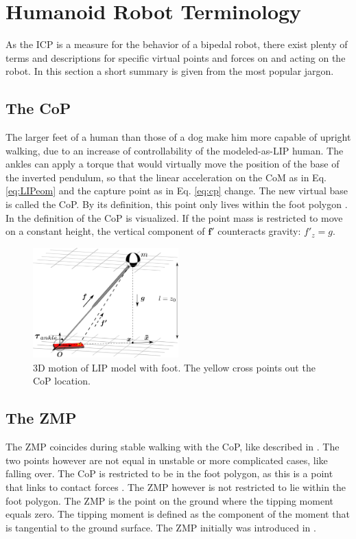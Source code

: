 \section{Humanoid Robot Terminology}
As the \ac{ICP} is a measure for the behavior of a bipedal robot, there exist plenty of terms and descriptions for specific virtual points and forces on and acting on the robot. In this section a short summary is given from the most popular jargon.

\subsection{The \ac{CoP}}
The larger feet of a human than those of a dog make him more capable of upright walking, due to an increase of controllability of the modeled-as-\ac{LIP} human. The ankles can apply a torque that would virtually move the position of the base of the inverted pendulum, so that the linear acceleration on the \ac{CoM} as in Eq. \eqref{eq:LIPeom} and the capture point as in Eq. \eqref{eq:cp} change. The new virtual base is called the \ac{CoP}. By its definition, this point only lives within the foot polygon \cite{vukobratovic2004zero}. In  the definition of the \ac{CoP} is visualized. If the point mass is restricted to move on a constant height, the vertical component of $\boldsymbol{f'}$ counteracts gravity: $f'_z=g$. 
\begin{figure}[h]
\centering
\includegraphics[width=0.5\textwidth]{STYLESTUFF/3DCoMwithfoot.png}
\caption{\ac{3D} motion of \ac{LIP} model with foot. The yellow cross points out the \ac{CoP} location.}
\label{fig:3dlipfoot}
\end{figure}

\subsection{The \ac{ZMP}}
The \ac{ZMP} coincides during stable walking with the \ac{CoP}, like described in \cite{vukobratovic2004zero}. The two points however are not equal in unstable or more complicated cases, like falling over.  The \ac{CoP} is restricted to be in the foot polygon, as this is a point that links to contact forces \cite{sardain2004forces}. The \ac{ZMP} however is not restricted to lie within the foot polygon. The \ac{ZMP} is the point on the ground where the tipping moment equals zero. The tipping moment is defined as the component of the moment that is tangential to the ground surface. The \ac{ZMP} initially was introduced in \cite{vukobratovic1969contribution}.

